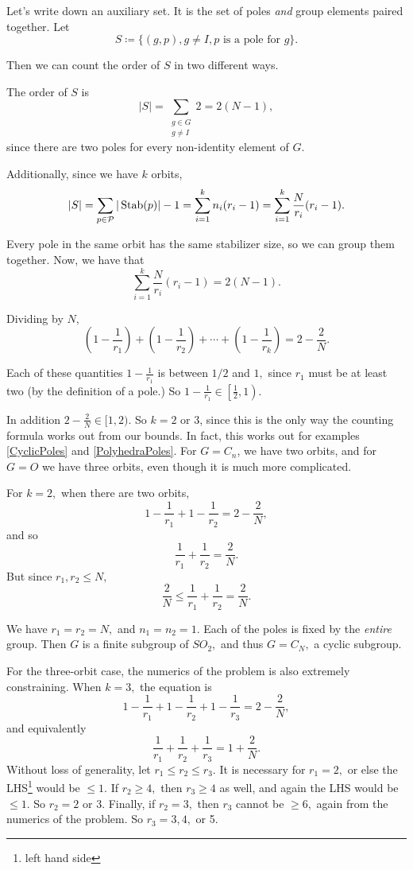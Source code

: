 Let's write down an auxiliary set. It is the set of poles \emph{and} group elements paired together. Let 
\[
S \coloneqq \{(g, p), g \neq I, p \text{ is a pole for }g\}.
\]

Then we can count the order of $S$ in two different ways. 

The order of $S$ is
\[
|S| = \sum_{\substack{g \in G\\ g \neq I}} 2 = 2(N-1),
\]
since there are two poles for every non-identity element of $G.$

Additionally, since we have $k$ orbits,
\[
|S| = \sum_{p \in \mathcal{P}} |\operatorname{Stab}(p)|  - 1 = \sum_{i = 1}^k n_i(r_i - 1) = \sum_{i=1}^k \frac{N}{r_i}(r_i - 1).
\]

Every pole in the same orbit has the same stabilizer size, so we can group them together.
Now, we have that 
\[
\sum_{i = 1}^k \frac{N}{r_i}(r_i-1) = 2(N-1). 
\]

Dividing by $N,$
\[
\left(1 - \frac{1}{r_1}\right) + \left(1 - \frac{1}{r_2}\right) + \cdots + \left(1 - \frac{1}{r_k}\right) = 2 - \frac{2}{N}.
\]

Each of these quantities $1 - \frac{1}{r_1}$ is between $1/2$ and $1,$ since $r_1$ must be at least two (by the definition of a pole.) %
So $1 - \frac{1}{r_1} \in \left[\frac{1}{2}, 1\right).$

In addition $2 - \frac{2}{N} \in [1, 2).$ So $k = 2$ or 3, since this is the only way the counting formula works out from our bounds. 
In fact, this works out for examples \ref{CyclicPoles} and \ref{PolyhedraPoles}. 
For $G=C_n$, we have two orbits, and for $G=O$ we have three orbits, even though it is much more complicated.

For $k = 2,$ when there are two orbits, 
\[
1 - \frac{1}{r_1} + 1 - \frac{1}{r_2} = 2 - \frac{2}{N},
\]
and so
\[
\frac{1}{r_1} + \frac{1}{r_2} = \frac{2}{N}.
\]
But since $r_1, r_2 \leq N,$ 
\[
\frac{2}{N} \leq \frac{1}{r_1} + \frac{1}{r_2} = \frac{2}{N}.
\]

We have $r_1 = r_2 = N,$ and $n_1 = n_2 = 1.$ Each of the poles is fixed by the \emph{entire} group. Then $G$ is a finite subgroup of $SO_2,$ and thus $G = C_N,$ a cyclic subgroup.

For the three-orbit case, the numerics of the problem is also extremely constraining. When $k = 3,$ the equation is 
\[
1 - \frac{1}{r_1} + 1 - \frac{1}{r_2} + 1 - \frac{1}{r_3} = 2 - \frac{2}{N},
\]
and equivalently 
\[
\frac{1}{r_1} + \frac{1}{r_2} + \frac{1}{r_3} = 1 + \frac{2}{N}.
\]
Without loss of generality, let $r_1 \leq r_2 \leq r_3.$ It is necessary for $r_1 = 2,$ or else the LHS\footnote{left hand side} would be $\leq 1.$ If $r_2\geq 4,$ then $r_3 \geq 4$ as well, and again the LHS would be $\leq 1.$ So $r_2 = 2$ or $3.$ Finally, if $r_2 = 3,$ then $r_3$ cannot be $\geq 6,$ again from the numerics of the problem. So $r_3 = 3, 4,$ or 5. 

